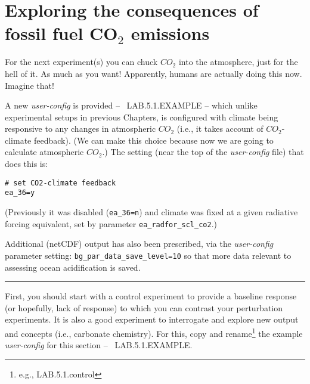 \newpage

\section{Exploring the consequences of fossil fuel CO$_{2}$ emissions}

For the next experiment(s) you can chuck \(CO_{2}\) into the atmosphere, just for the hell of it. As much as you want! Apparently, humans are actually doing this now. Imagine that!

\vspace{1mm}

A new \textit{user-config} is provided -- \textsf{\footnotesize\ LAB.5.1.EXAMPLE} -- which unlike experimental setups in previous Chapters, is configured with climate being responsive to any changes in atmospheric \(CO_{2}\) (i.e., it takes account of \(CO_{2}\)-climate feedback). (We can make this choice because now we are going to calculate atmospheric $CO_{2}$.) The setting (near the top of the \textit{user-config} file) that does this is:
\vspace{-2pt}\small\begin{verbatim}
# set CO2-climate feedback
ea_36=y
\end{verbatim}\normalsize\vspace{-2pt}
(Previously it was disabled (\texttt{\small ea\_36=n}) and climate was fixed at a given radiative forcing equivalent, set by parameter \texttt{\small ea\_radfor\_scl\_co2}.)

\vspace{1mm}
Additional (netCDF) output has also been prescribed, via the \textit{user-config} parameter setting: \texttt{\small bg\_par\_data\_save\_level=10} so that more data relevant to assessing ocean acidification is saved.

\vspace{1mm}\noindent\rule{4cm}{0.1mm}\vspace{2mm}

\noindent First, you should start with a control experiment to provide a baseline response (or hopefully, lack of response) to which you can contrast your perturbation experiments. It is also a good experiment to interrogate and explore new output and concepts (i.e., carbonate chemistry). For this, copy and rename\footnote{e.g., \textsf{LAB.5.1.control}} the example \textit{user-config} for this section -- \textsf{\footnotesize\ LAB.5.1.EXAMPLE}.

